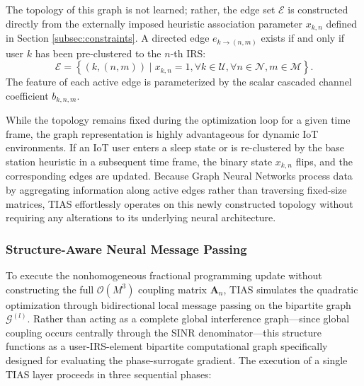 \documentclass[journal]{IEEEtran}
\begin{document}
The topology of this graph is not learned; rather, the edge set $\mathcal{E}$ is constructed directly from the externally imposed heuristic association parameter $x_{k,n}$ defined in Section \ref{subsec:constraints}. A directed edge $e_{k \to (n,m)}$ exists if and only if user $k$ has been pre-clustered to the $n$-th IRS:
\begin{equation}
    \mathcal{E} = \left\{ (k, (n,m)) \mid x_{k,n} = 1, \forall k \in \mathcal{U}, \forall n \in \mathcal{N}, m \in \mathcal{M} \right\}.
\end{equation}
The feature of each active edge is parameterized by the scalar cascaded channel coefficient $b_{k,n,m}$. 

While the topology remains fixed during the optimization loop for a given time frame, the graph representation is highly advantageous for dynamic IoT environments. If an IoT user enters a sleep state or is re-clustered by the base station heuristic in a subsequent time frame, the binary state $x_{k,n}$ flips, and the corresponding edges are updated. Because Graph Neural Networks process data by aggregating information along active edges rather than traversing fixed-size matrices, TIAS effortlessly operates on this newly constructed topology without requiring any alterations to its underlying neural architecture.

\subsubsection{Structure-Aware Neural Message Passing}
\label{subsubsec:tias_message_passing}

To execute the nonhomogeneous fractional programming update without constructing the full $\mathcal{O}(M^3)$ coupling matrix $\mathbf{A}_n$, TIAS simulates the quadratic optimization through bidirectional local message passing on the bipartite graph $\mathcal{G}^{(l)}$. Rather than acting as a complete global interference graph—since global coupling occurs centrally through the SINR denominator—this structure functions as a user-IRS-element bipartite computational graph specifically designed for evaluating the phase-surrogate gradient. The execution of a single TIAS layer proceeds in three sequential phases:
\end{document}
